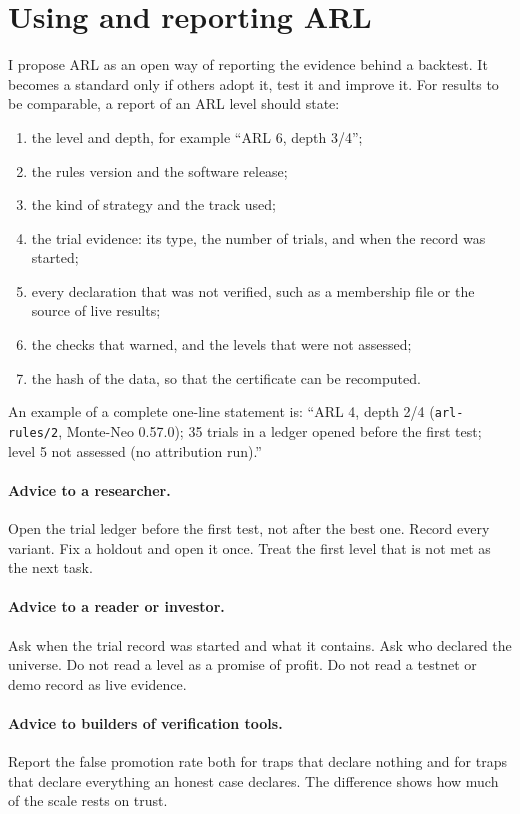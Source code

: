 \documentclass[11pt]{article}
\begin{document}
\section{Using and reporting ARL}\label{sec:use}

I propose ARL as an open way of reporting the evidence behind a backtest. It becomes a standard only if others adopt it,
test it and improve it. For results to be comparable, a report of an ARL level should state:
\begin{enumerate}
\item the level and depth, for example ``ARL 6, depth 3/4'';
\item the rules version and the software release;
\item the kind of strategy and the track used;
\item the trial evidence: its type, the number of trials, and when the record was started;
\item every declaration that was not verified, such as a membership file or the source of live results;
\item the checks that warned, and the levels that were not assessed;
\item the hash of the data, so that the certificate can be recomputed.
\end{enumerate}
An example of a complete one-line statement is: ``ARL 4, depth 2/4 (\texttt{arl-rules/2}, Monte-Neo 0.57.0); 35 trials in
a ledger opened before the first test; level 5 not assessed (no attribution run).''

\paragraph{Advice to a researcher.} Open the trial ledger before the first test, not after the best one. Record every
variant. Fix a holdout and open it once. Treat the first level that is not met as the next task.

\paragraph{Advice to a reader or investor.} Ask when the trial record was started and what it contains. Ask who declared
the universe. Do not read a level as a promise of profit. Do not read a testnet or demo record as live evidence.

\paragraph{Advice to builders of verification tools.} Report the false promotion rate both for traps that declare nothing
and for traps that declare everything an honest case declares. The difference shows how much of the scale rests on
trust.
\end{document}
